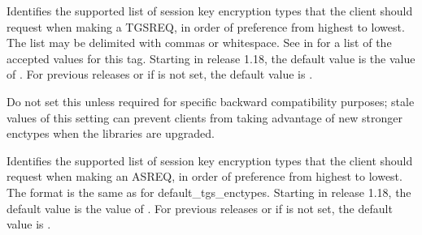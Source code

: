 \documentclass[letterpaper,10pt,english]{sphinxmanual}
\begin{document}
\begin{description}
\sphinxAtStartPar
Identifies the supported list of session key encryption types that
the client should request when making a TGS\sphinxhyphen{}REQ, in order of
preference from highest to lowest.  The list may be delimited with
commas or whitespace.  See {\hyperref[\detokenize{admin/conf_files/kdc_conf:encryption-types}]{}} in
{\hyperref[\detokenize{admin/conf_files/kdc_conf:kdc-conf-5}]{}} for a list of the accepted values for this tag.
Starting in release 1.18, the default value is the value of
.  For previous releases or if
 is not set, the default value is
.

\sphinxAtStartPar
Do not set this unless required for specific backward
compatibility purposes; stale values of this setting can prevent
clients from taking advantage of new stronger enctypes when the
libraries are upgraded.

\sphinxAtStartPar
Identifies the supported list of session key encryption types that
the client should request when making an AS\sphinxhyphen{}REQ, in order of
preference from highest to lowest.  The format is the same as for
default\_tgs\_enctypes.  Starting in release 1.18, the default
value is the value of .  For previous
releases or if  is not set, the default
value is .


\end{description}
\end{document}
